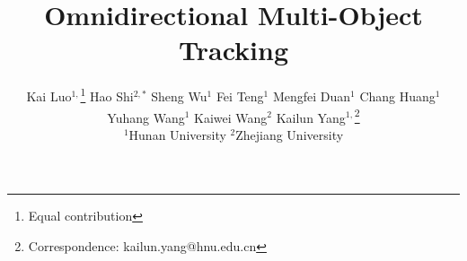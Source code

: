 \documentclass[10pt,twocolumn,letterpaper]{article}
\title{Omnidirectional Multi-Object Tracking}
\author{
Kai Luo$^{1,}$\thanks{Equal contribution} \quad Hao Shi$^{2,*}$ \quad Sheng Wu$^{1}$ \quad Fei Teng$^{1}$ \quad Mengfei Duan$^{1}$ \quad Chang Huang$^{1}$\\Yuhang Wang$^{1}$ \quad Kaiwei Wang$^{2}$ \quad Kailun Yang$^{1,}$\thanks{Correspondence: kailun.yang@hnu.edu.cn}\\
$^{1}$Hunan University \quad $^{2}$Zhejiang University\\
}
\begin{document}
\maketitle

    








{
    \small
    
    
}


\end{document}
